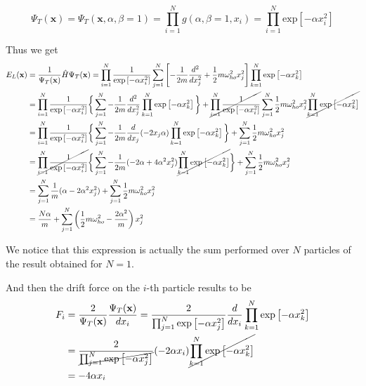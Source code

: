 \documentclass{article}
\begin{document}
\begin{equation*}
    \Psi_T(\mathbf{x}) = \Psi_T(\mathbf{x},\alpha,\beta=1)
    = \prod_{i=1}^N g(\alpha,\beta=1,x_i) = \prod_{i=1}^N \text{exp} \left[-\alpha x_i^2\right]
\end{equation*}
 
Thus we get
\begin{align*}
    E_L(\mathbf{x}) &= \frac{1}{\Psi_T(\mathbf{x})}\hat{H}\Psi_T(\mathbf{x}) = \prod_{i=1}^N \frac{1}{\text{exp}\left[-\alpha x_i^2\right]} \sum_{j=1}^N \left[ -\frac{1}{2m} \frac{d^2}{dx_j^2} + \frac{1}{2} m \omega_{ho}^2 x_j^2 \right] \prod_{k=1}^N \text{exp}\left[-\alpha x_k^2\right] \\
    &=  \prod_{i=1}^N \frac{1}{\text{exp}\left[-\alpha x_i^2\right]}\bigg\{ \sum_{j=1}^N -\frac{1}{2m} \frac{d^2}{dx_j^2} \prod_{k=1}^N \text{exp}\left[-\alpha x_k^2\right] \bigg\} + \cancel{\prod_{i=1}^N \frac{1}{\text{exp}\left[-\alpha x_i^2\right]}} \sum_{j=1}^N \frac{1}{2} m \omega_{ho}^2 x_j^2  \cancel{\prod_{k=1}^N \text{exp}\left[-\alpha x_k^2\right]} \\
    &= \prod_{i=1}^N \frac{1}{\text{exp}\left[-\alpha x_i^2\right]} \bigg\{ \sum_{j=1}^N -\frac{1}{2m} \frac{d}{dx_j} (-2 x_j \alpha)  \prod_{k=1}^N \text{exp}\left[-\alpha x_k^2\right] \bigg\} + \sum_{j=1}^N \frac{1}{2} m \omega_{ho}^2 x_j^2 \\
    &= \cancel{\prod_{i=1}^N \frac{1}{\text{exp}\left[-\alpha x_i^2\right]}} \bigg\{ \sum_{j=1}^N -\frac{1}{2m} (-2 \alpha + 4\alpha^2 x_j^2) \cancel{ \prod_{k=1}^N \text{exp}\left[-\alpha x_k^2\right]} \bigg\} + \sum_{j=1}^N \frac{1}{2} m \omega_{ho}^2 x_j^2 \\
    &= \sum_{j=1}^N \frac{1}{m} (\alpha - 2\alpha^2 x_j^2) + \sum_{j=1}^N \frac{1}{2} m \omega_{ho}^2 x_j^2 \\
    &= \frac{N\alpha}{m} + \sum_{j=1}^N \left(\frac{1}{2} m \omega_{ho}^2 - \frac{2\alpha^2}{m} \right)  x_j^2 
\end{align*}

We notice that this expression is actually the sum performed over $N$ particles of the result obtained for $N=1$.

And then the drift force on the $i$-th particle results to be
\begin{align*}
    F_i &= \frac{2}{\Psi_T(\mathbf{x})} \frac{\Psi_T(\mathbf{x})}{dx_i} = \frac{2}{\prod_{j=1}^N \text{exp}\left[-\alpha x_j^2\right]} \frac{d}{dx_i} \prod_{k=1}^N \text{exp}\left[-\alpha x_k^2\right] \\
    &= \frac{2}{\cancel{\prod_{j=1}^N \text{exp}\left[-\alpha x_j^2\right]}} (-2\alpha x_i) \cancel{\prod_{k=1}^N \text{exp}\left[-\alpha x_k^2\right]}\\
    &= -4\alpha x_i
\end{align*}
\end{document}
